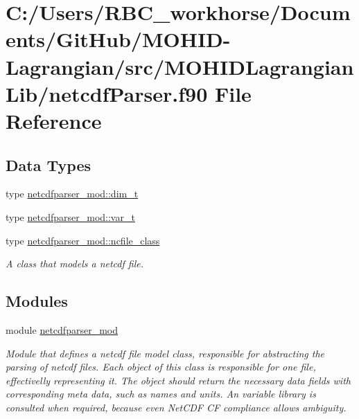 \hypertarget{netcdf_parser_8f90}{}\section{C\+:/\+Users/\+R\+B\+C\+\_\+workhorse/\+Documents/\+Git\+Hub/\+M\+O\+H\+I\+D-\/\+Lagrangian/src/\+M\+O\+H\+I\+D\+Lagrangian\+Lib/netcdf\+Parser.f90 File Reference}
\label{netcdf_parser_8f90}
\subsection*{Data Types}
\begin{DoxyCompactItemize}
\item 
type \mbox{\hyperlink{structnetcdfparser__mod_1_1dim__t}{netcdfparser\+\_\+mod\+::dim\+\_\+t}}
\item 
type \mbox{\hyperlink{structnetcdfparser__mod_1_1var__t}{netcdfparser\+\_\+mod\+::var\+\_\+t}}
\item 
type \mbox{\hyperlink{structnetcdfparser__mod_1_1ncfile__class}{netcdfparser\+\_\+mod\+::ncfile\+\_\+class}}
\begin{DoxyCompactList}\small\item\em A class that models a netcdf file. \end{DoxyCompactList}\end{DoxyCompactItemize}
\subsection*{Modules}
\begin{DoxyCompactItemize}
\item 
module \mbox{\hyperlink{namespacenetcdfparser__mod}{netcdfparser\+\_\+mod}}
\begin{DoxyCompactList}\small\item\em Module that defines a netcdf file model class, responsible for abstracting the parsing of netcdf files. Each object of this class is responsible for one file, effectivelly representing it. The object should return the necessary data fields with corresponding meta data, such as names and units. An variable library is consulted when required, because even Net\+C\+DF CF compliance allows ambiguity. \end{DoxyCompactList}\end{DoxyCompactItemize}
